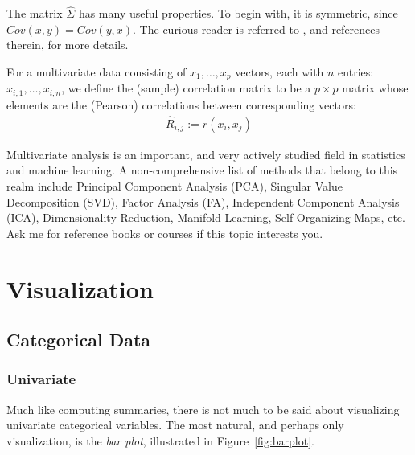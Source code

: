\documentclass[12pt,a4paper]{report}
\begin{document}
\begin{extra}
The matrix $\hat{\Sigma}$ has many useful properties. 
To begin with, it is symmetric, since $Cov(x,y)=Cov(y,x)$.
The curious reader is referred to \cite{petersen_matrix_2006}, and references therein, for more details.
\end{extra}

\begin{definition}
For a multivariate data consisting of $x_1,\dots,x_p$ vectors, each with $n$ entries: $x_{i,1},\dots,x_{i,n}$, we define the (sample) correlation matrix to be a $p\times p$ matrix whose elements are the (Pearson) correlations between corresponding vectors:
\begin{align}
	\hat{R}_{i,j}:= r(x_i, x_j)
\end{align}
\end{definition}


\begin{extra}
Multivariate analysis is an important, and very actively studied field in statistics and machine learning.
A non-comprehensive list of methods that belong to this realm include 
Principal Component Analysis (PCA),
Singular Value Decomposition (SVD), 
Factor Analysis (FA), 
Independent Component Analysis (ICA),
Dimensionality Reduction, 
Manifold Learning, 
Self Organizing Maps, 
etc.
Ask me for reference books or courses if this topic interests you.
\end{extra}

\afterpage{\clearpage}


\section{Visualization}

\subsection{Categorical Data}



\subsubsection{Univariate}
Much like computing summaries, there is not much to be said about visualizing univariate categorical variables. 
The most natural, and perhaps only visualization, is the \emph{bar plot}, illustrated in Figure~\ref{fig:barplot}.
\end{document}
